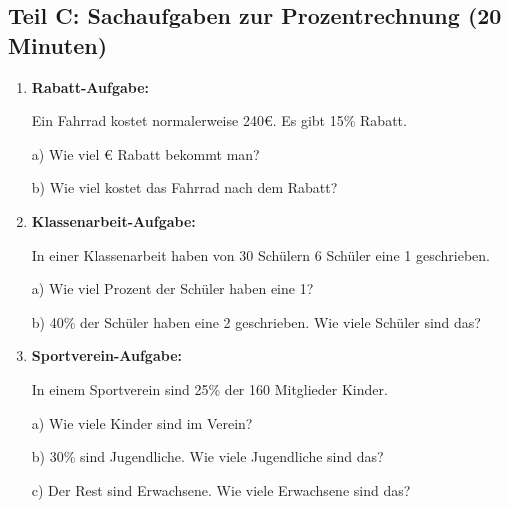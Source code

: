 \subsection*{Teil C: Sachaufgaben zur Prozentrechnung (20 Minuten)}

\begin{enumerate}[label=\arabic*.]
    \item \textbf{Rabatt-Aufgabe:}

    Ein Fahrrad kostet normalerweise 240€. Es gibt 15\% Rabatt.

    a) Wie viel € Rabatt bekommt man? \underline{\hspace{3cm}}

    b) Wie viel kostet das Fahrrad nach dem Rabatt? \underline{\hspace{3cm}}

    \vspace{0.5cm}

    \item \textbf{Klassenarbeit-Aufgabe:}

    In einer Klassenarbeit haben von 30 Schülern 6 Schüler eine 1 geschrieben.

    a) Wie viel Prozent der Schüler haben eine 1? \underline{\hspace{3cm}}

    b) 40\% der Schüler haben eine 2 geschrieben. Wie viele Schüler sind das? \underline{\hspace{3cm}}

    \vspace{0.5cm}

    \item \textbf{Sportverein-Aufgabe:}

    In einem Sportverein sind 25\% der 160 Mitglieder Kinder.

    a) Wie viele Kinder sind im Verein? \underline{\hspace{3cm}}

    b) 30\% sind Jugendliche. Wie viele Jugendliche sind das? \underline{\hspace{3cm}}

    c) Der Rest sind Erwachsene. Wie viele Erwachsene sind das? \underline{\hspace{3cm}}

\end{enumerate}